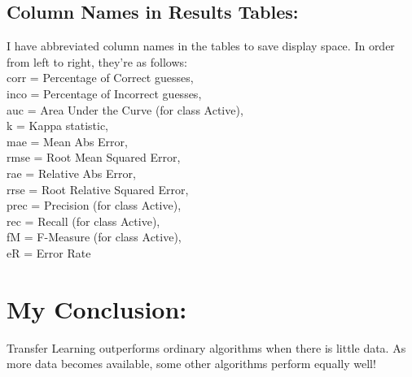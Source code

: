 \documentclass[a4paper,12pt, english]{article}
\begin{document}
\newpage
\subsection{Column Names in Results Tables:}
I have abbreviated column names in the tables to save display space. In order from left to right, they're as follows:\\
corr = Percentage of Correct guesses,\\
inco = Percentage of Incorrect guesses,\\
auc = Area Under the Curve (for class Active),\\
k = Kappa statistic,\\
mae = Mean Abs Error,\\
rmse = Root Mean Squared Error,\\
rae = Relative Abs Error,\\
rrse = Root Relative Squared Error,\\
prec = Precision (for class Active),\\
rec = Recall (for class Active),\\
fM = F-Measure (for class Active),\\
eR = Error Rate\\


\section{My Conclusion:}
Transfer Learning outperforms ordinary algorithms when there is little data. As more data becomes available, some other algorithms perform equally well!



\end{document}
